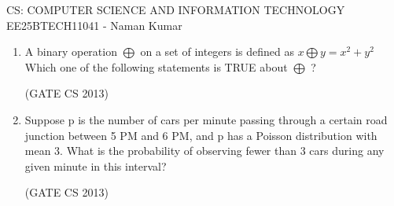 \documentclass[a4paper, 11pt]{article}
\begin{document}
\begin{center}
    \huge{CS: COMPUTER SCIENCE AND INFORMATION TECHNOLOGY}\\
    \large{EE25BTECH11041 - Naman Kumar}
\end{center}
 \begin{enumerate}
     \item A binary operation $\bigoplus$ on a set of integers is defined as $x\bigoplus y=x^2+y^2$ Which one of the following statements is TRUE about $\bigoplus$ ?
    \begin{enumerate}
    \end{enumerate}

    \hfill (GATE CS 2013)
    
    \item Suppose p is the number of cars per minute passing through a certain road junction between 5 PM and 6 PM, and p has a Poisson distribution with mean 3. What is the probability of observing fewer than 3 cars during any given minute in this interval?
    \begin{enumerate}
    \end{enumerate}
    
    \hfill (GATE CS 2013)
    

\end{enumerate}
\end{document}
